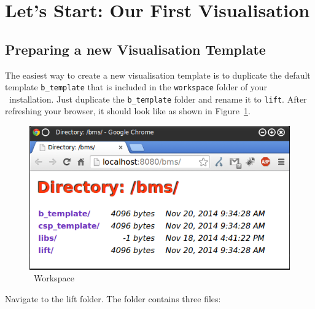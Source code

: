 \section{Let's Start: Our First Visualisation}
\label{tutorial_03}


\subsection{Preparing a new Visualisation Template}

The easiest way to create a new visualisation template is to duplicate the default template \texttt{b\_template} that is included in the \texttt{workspace} folder of your \bms~installation.
Just duplicate the \texttt{b\_template} folder and rename it to \texttt{lift}.
After refreshing your browser, it should look like as shown in Figure~\ref{fig_tut_01_workspace}.

\begin{figure}[!ht]
\begin{center}
	\includegraphics[]{img/tutorial/tut_01.png}
	\caption{\bms~Workspace}
	\label{fig_tut_01_workspace}
\end{center}
\end{figure}

Navigate to the lift folder. The folder contains three files:

